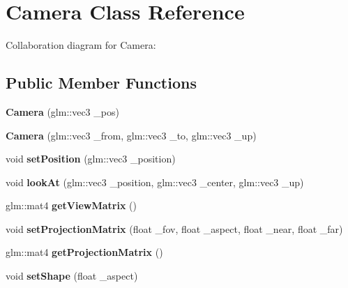 \hypertarget{class_camera}{\section{Camera Class Reference}
\label{class_camera}
}


Collaboration diagram for Camera\-:
\subsection*{Public Member Functions}
\begin{DoxyCompactItemize}
\item 
\hypertarget{class_camera_a583c769d57c096097a4cd55b0508acb9}{{\bfseries Camera} (glm\-::vec3 \-\_\-pos)}\label{class_camera_a583c769d57c096097a4cd55b0508acb9}

\item 
\hypertarget{class_camera_a9ba94b1982b3c9e19c129411cae94f84}{{\bfseries Camera} (glm\-::vec3 \-\_\-from, glm\-::vec3 \-\_\-to, glm\-::vec3 \-\_\-up)}\label{class_camera_a9ba94b1982b3c9e19c129411cae94f84}

\item 
\hypertarget{class_camera_a4cfdd84e228c1353ee42ddd67059119b}{void {\bfseries set\-Position} (glm\-::vec3 \-\_\-position)}\label{class_camera_a4cfdd84e228c1353ee42ddd67059119b}

\item 
\hypertarget{class_camera_a0b021889f36bc9ba71eb55eef4d81651}{void {\bfseries look\-At} (glm\-::vec3 \-\_\-position, glm\-::vec3 \-\_\-center, glm\-::vec3 \-\_\-up)}\label{class_camera_a0b021889f36bc9ba71eb55eef4d81651}

\item 
\hypertarget{class_camera_a5569ca5967e01d3344fbf6aba36d9820}{glm\-::mat4 {\bfseries get\-View\-Matrix} ()}\label{class_camera_a5569ca5967e01d3344fbf6aba36d9820}

\item 
\hypertarget{class_camera_a2cb6fc559062f2c3aea4856d8838adf9}{void {\bfseries set\-Projection\-Matrix} (float \-\_\-fov, float \-\_\-aspect, float \-\_\-near, float \-\_\-far)}\label{class_camera_a2cb6fc559062f2c3aea4856d8838adf9}

\item 
\hypertarget{class_camera_adf09522521723786b9f405c99d6594c7}{glm\-::mat4 {\bfseries get\-Projection\-Matrix} ()}\label{class_camera_adf09522521723786b9f405c99d6594c7}

\item 
\hypertarget{class_camera_a019c5a2e4e223af12e8c1b6c48cd825b}{void {\bfseries set\-Shape} (float \-\_\-aspect)}\label{class_camera_a019c5a2e4e223af12e8c1b6c48cd825b}


\end{DoxyCompactItemize}
